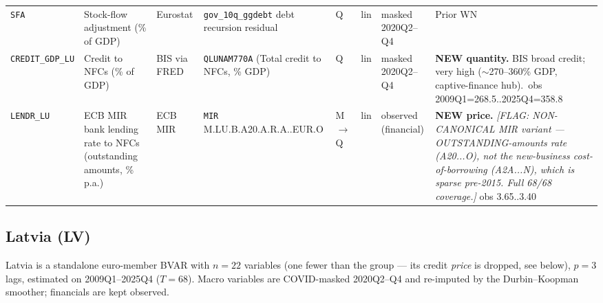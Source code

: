 {\begin{longtable}{@{}p{1.9cm}p{2.9cm}p{1.5cm}p{2.7cm}p{0.7cm}p{1.0cm}p{1.6cm}p{2.4cm}@{}}
\texttt{SFA}          & Stock-flow adjustment (\% of GDP) & Eurostat & \texttt{gov\_10q\_ggdebt} debt recursion residual      & Q & lin & masked 2020Q2--Q4 & Prior WN \\
\texttt{CREDIT\_GDP\_LU} & Credit to NFCs (\% of GDP)     & BIS via FRED & \texttt{QLUNAM770A} (Total credit to NFCs, \% GDP)    & Q & lin & masked 2020Q2--Q4 & \textbf{NEW quantity.} BIS broad credit; very high (\(\sim\)270--360\% GDP, captive-finance hub).\ obs 2009Q1=268.5..2025Q4=358.8 \\
\texttt{LENDR\_LU}    & ECB MIR bank lending rate to NFCs (outstanding amounts, \% p.a.) & ECB MIR & \texttt{MIR} M.\allowbreak LU.\allowbreak B.\allowbreak A20.\allowbreak A.\allowbreak R.\allowbreak A.\allowbreak 2240.\allowbreak EUR.\allowbreak O & M$\to$Q & lin & observed (financial) & \textbf{NEW price.} \textit{[FLAG: NON-CANONICAL MIR variant --- OUTSTANDING-amounts rate (A20...O), not the new-business cost-of-borrowing (A2A...N), which is sparse pre-2015. Full 68/68 coverage.]} obs 3.65..3.40 \\
\end{longtable}}

\subsection{Latvia (LV)}\label{sec:data:LV}
Latvia is a standalone euro-member BVAR with $n=22$ variables (one fewer
than the group --- its credit \emph{price} is dropped, see below),
$p=3$ lags, estimated on 2009Q1--2025Q4 ($T=68$).  Macro variables are
COVID-masked 2020Q2--Q4 and re-imputed by the Durbin--Koopman smoother;
financials are kept observed.

